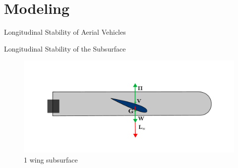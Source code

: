 \documentclass[9pt, xcolor={usenames, dvipsnames}]{beamer}
\begin{document}
    \section{Modeling}
    
        \begin{frame}{Longitudinal Stability of Aerial Vehicles}
            \begin{figure}
                \centering
                \begin{overprint}
                \end{overprint}
            \end{figure}
        \end{frame}

        \begin{frame}{Longitudinal Stability of the Subsurface}
            \begin{figure}
                \centering
                \includegraphics[width=\textwidth]{imgs/subsurface_1wing}
                \caption{1 wing subsurface}
            \end{figure}
        \end{frame}
\end{document}
